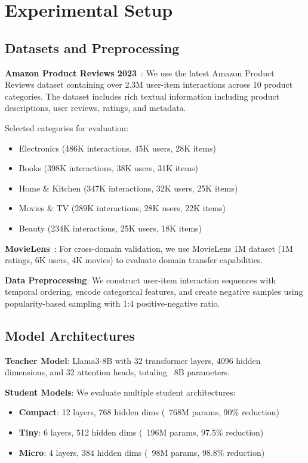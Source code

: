 \documentclass[10pt,conference]{IEEEtran}
\begin{document}
\section{Experimental Setup}

\subsection{Datasets and Preprocessing}

\textbf{Amazon Product Reviews 2023}~\cite{hou2024bridging}: We use the latest Amazon Product Reviews dataset containing over 2.3M user-item interactions across 10 product categories. The dataset includes rich textual information including product descriptions, user reviews, ratings, and metadata.

Selected categories for evaluation:
\begin{itemize}[leftmargin=*]
    \item Electronics (486K interactions, 45K users, 28K items)
    \item Books (398K interactions, 38K users, 31K items)
    \item Home \& Kitchen (347K interactions, 32K users, 25K items)
    \item Movies \& TV (289K interactions, 28K users, 22K items)
    \item Beauty (234K interactions, 25K users, 18K items)
\end{itemize}

\textbf{MovieLens}~\cite{harper2015movielens}: For cross-domain validation, we use MovieLens 1M dataset (1M ratings, 6K users, 4K movies) to evaluate domain transfer capabilities.

\textbf{Data Preprocessing}: We construct user-item interaction sequences with temporal ordering, encode categorical features, and create negative samples using popularity-based sampling with 1:4 positive-negative ratio.

\subsection{Model Architectures}

\textbf{Teacher Model}: Llama3-8B with 32 transformer layers, 4096 hidden dimensions, and 32 attention heads, totaling ~8B parameters.

\textbf{Student Models}: We evaluate multiple student architectures:
\begin{itemize}[leftmargin=*]
    \item \textbf{Compact}: 12 layers, 768 hidden dims (~768M params, 90\% reduction)
    \item \textbf{Tiny}: 6 layers, 512 hidden dims (~196M params, 97.5\% reduction)  
    \item \textbf{Micro}: 4 layers, 384 hidden dims (~98M params, 98.8\% reduction)
\end{itemize}
\end{document}
